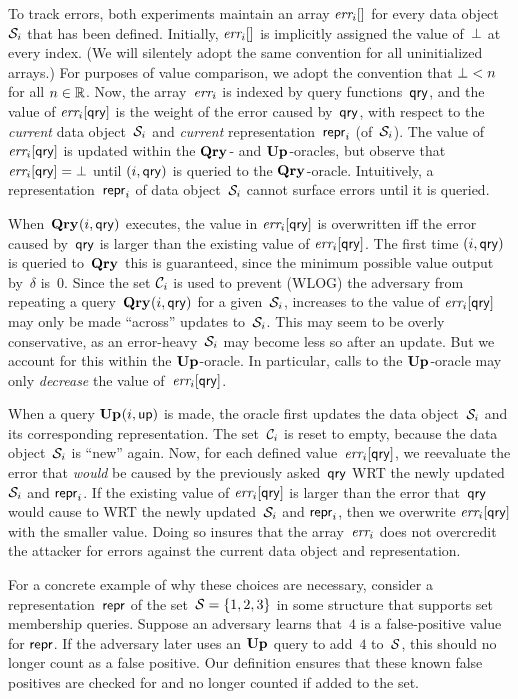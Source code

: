 To track errors, both experiments maintain an array $\textit{err}_i[]$ for every data
object~$\mathcal{S}_i$ that has been defined.  Initially, $\textit{err}_i[]$ is implicitly
assigned the value of~$\bot$ at every index. (We will silentely adopt the
same convention for all uninitialized arrays.) For purposes of value
comparison, we adopt the convention that $\bot < n$ for all $n \in \mathbb{R}$.
%
Now, the array~$\textit{err}_i$ is indexed by query functions~$\mathsf{qry}$, and the value of
$\textit{err}_i[\mathsf{qry}]$ is the weight of the error caused by~$\mathsf{qry}$, with respect to
the \emph{current} data object~$\mathcal{S}_i$ and \emph{current}
representation~$\mathsf{repr}_i$ (of~$\mathcal{S}_i$).
%
The value of~$\textit{err}_i[\mathsf{qry}]$ is updated within the $\textup{\textbf{Qry}}\hspace{0.5pt}$- and $\textup{\textbf{Up}}\hspace{0.5pt}$-oracles,
but observe that $\textit{err}_i[\mathsf{qry}] = \bot$ until $(i,\mathsf{qry})$ is queried to the
$\textup{\textbf{Qry}}\hspace{0.5pt}$-oracle.  Intuitively, a representation~$\mathsf{repr}_i$ of data object~$\mathcal{S}_i$
cannot surface errors until it is queried.

When~$\textup{\textbf{Qry}}\hspace{0.5pt}(i,\mathsf{qry})$ executes, the value in $\textit{err}_i[\mathsf{qry}]$ is overwritten iff
the error caused by~$\mathsf{qry}$ is larger than the existing value of $\textit{err}_i[\mathsf{qry}]$.
The first time $(i,\mathsf{qry})$ is queried to~$\textup{\textbf{Qry}}\hspace{0.5pt}$ this is guaranteed, since the
minimum possible value output by~$\delta$ is~$0$.  Since the set $\mathcal{C}_i$
  is used to prevent (WLOG) the adversary from repeating a
query~$\textup{\textbf{Qry}}\hspace{0.5pt}(i,\mathsf{qry})$ for a given~$\mathcal{S}_i$, increases to the value of
$\textit{err}_i[\mathsf{qry}]$ may only be made ``across'' updates to~$\mathcal{S}_i$.  This may seem
to be overly conservative, as an error-heavy~$\mathcal{S}_i$ may become less so after
an update.  But we account for this within the $\textup{\textbf{Up}}\hspace{0.5pt}$-oracle.  In particular,
calls to the $\textup{\textbf{Up}}\hspace{0.5pt}$-oracle may only \emph{decrease} the value of~$\textit{err}_i[\mathsf{qry}]$.

When a query $\textup{\textbf{Up}}\hspace{0.5pt}(i,\mathsf{up})$ is made, the oracle first updates the data
object~$\mathcal{S}_i$ and its corresponding representation.  The set~$\mathcal{C}_i$
 is reset to empty, because the data object~$\mathcal{S}_i$ is
``new'' again.
%
Now, for each defined value~$\textit{err}_i[\mathsf{qry}]$, we reevaluate the error that
\emph{would} be caused by the previously asked~$\mathsf{qry}$ WRT the newly updated
$\mathcal{S}_i$ and $\mathsf{repr}_i$. If the existing value of $\textit{err}_i[\mathsf{qry}]$ is larger than
the error that~$\mathsf{qry}$ would cause to WRT the newly updated~$\mathcal{S}_i$ and
$\mathsf{repr}_i$, then we overwrite $\textit{err}_i[\mathsf{qry}]$ with the smaller value.  Doing so
insures that the array~$\textit{err}_i$ does not overcredit the attacker for errors
against the current data object and representation.

For a concrete example of why these choices are necessary, consider a
representation~$\mathsf{repr}$ of the set~$\mathcal{S} = \{1,2,3\}$ in some structure that
supports set membership queries. Suppose an adversary learns that~$4$ is a
false-positive value for $\mathsf{repr}$. If the adversary later uses an $\textup{\textbf{Up}}\hspace{0.5pt}$ query to
add~$4$ to~$\mathcal{S}$, this should no longer count as a false positive. Our
definition ensures that these known false positives are checked for and no
longer counted if added to the set.

